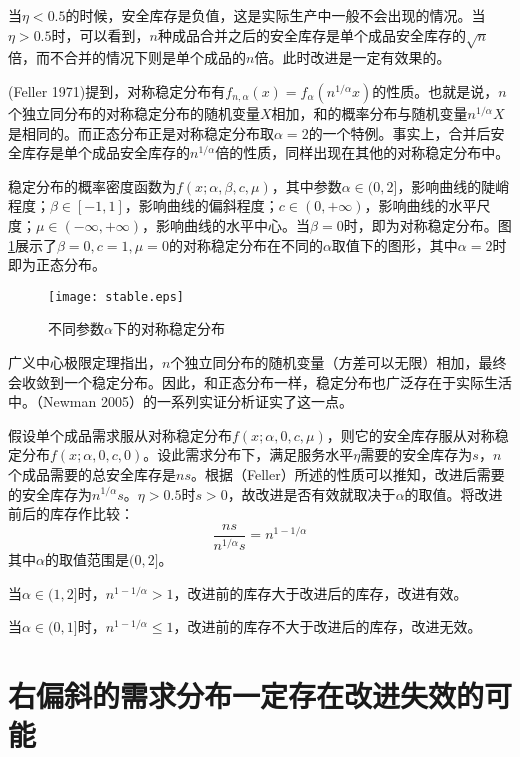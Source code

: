 当$\eta<0.5$的时候，安全库存是负值，这是实际生产中一般不会出现的情况。当$\eta>0.5$时，可以看到，$n$种成品合并之后的安全库存是单个成品安全库存的$\sqrt{n}$倍，而不合并的情况下则是单个成品的$n$倍。此时改进是一定有效果的。

(Feller 1971)提到，对称稳定分布有$f_{n,\alpha}(x)=f_\alpha(n^{1/\alpha}x)$的性质。也就是说，$n$个独立同分布的对称稳定分布的随机变量$X$相加，和的概率分布与随机变量$n^{1/\alpha}X$是相同的。而正态分布正是对称稳定分布取$\alpha=2$的一个特例。事实上，合并后安全库存是单个成品安全库存的$n^{1/\alpha}$倍的性质，同样出现在其他的对称稳定分布中。

稳定分布的概率密度函数为$f(x;\alpha,\beta,c,\mu)$，其中参数$\alpha\in(0,2]$，影响曲线的陡峭程度；$\beta\in[-1,1]$，影响曲线的偏斜程度；$c\in(0,+\infty)$，影响曲线的水平尺度；$\mu\in(-\infty,+\infty)$，影响曲线的水平中心。当$\beta=0$时，即为对称稳定分布。图
\ref{fig:对称稳定分布}展示了$\beta=0,c=1,\mu=0$的对称稳定分布在不同的$\alpha$取值下的图形，其中$\alpha=2$时即为正态分布。

\begin{figure}[htb]
\centering
\texttt{[image: stable.eps]}
\caption{不同参数$\alpha$下的对称稳定分布}
\label{fig:对称稳定分布}
\end{figure}

广义中心极限定理指出，$n$个独立同分布的随机变量（方差可以无限）相加，最终会收敛到一个稳定分布。因此，和正态分布一样，稳定分布也广泛存在于实际生活中。（Newman 2005）的一系列实证分析证实了这一点。

假设单个成品需求服从对称稳定分布$f(x;\alpha,0,c,\mu)$，则它的安全库存服从对称稳定分布$f(x;\alpha,0,c,0)$。设此需求分布下，满足服务水平$\eta$需要的安全库存为$s$，$n$个成品需要的总安全库存是$ns$。根据（Feller）所述的性质可以推知，改进后需要的安全库存为$n^{1/\alpha}s$。$\eta>0.5$时$s>0$，故改进是否有效就取决于$\alpha$的取值。将改进前后的库存作比较：
\[
\frac{ns}{n^{1/\alpha}s} = n^{1-1/\alpha}
\]
其中$\alpha$的取值范围是$(0,2]$。

当$\alpha\in(1,2]$时，$n^{1-1/\alpha}>1$，改进前的库存大于改进后的库存，改进有效。

当$\alpha\in(0,1]$时，$n^{1-1/\alpha}\leq 1$，改进前的库存不大于改进后的库存，改进无效。









\section{右偏斜的需求分布一定存在改进失效的可能}

